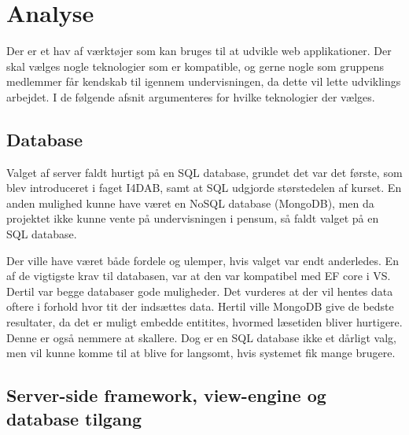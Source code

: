 \chapter{Analyse}

Der er et hav af værktøjer som kan bruges til at udvikle web applikationer. Der skal vælges nogle teknologier som er kompatible, og gerne nogle som gruppens medlemmer får kendskab til igennem undervisningen, da dette vil lette udviklings arbejdet. I de følgende afsnit argumenteres for hvilke teknologier der vælges.

\section{Database}
Valget af server faldt hurtigt på en SQL database, grundet det var det første, som blev introduceret i faget I4DAB\cite{DAB_Kursuskatalog}, samt at SQL udgjorde størstedelen af kurset. En anden mulighed kunne have været en NoSQL database (MongoDB), men da projektet ikke kunne vente på undervisningen i pensum, så faldt valget på en SQL database.

Der ville have været både fordele og ulemper, hvis valget var endt anderledes. En af de vigtigste krav til databasen, var at den var kompatibel med EF core i VS. Dertil var begge databaser gode muligheder. Det vurderes at der vil hentes data oftere i forhold hvor tit der indsættes data. Hertil ville MongoDB give de bedste resultater, da det er muligt embedde entitites, hvormed læsetiden bliver hurtigere. Denne er også nemmere at skallere. Dog er en SQL database ikke et dårligt valg, men vil kunne komme til at blive for langsomt, hvis systemet fik mange brugere. 

\section{Server-side framework, view-engine og database tilgang}


